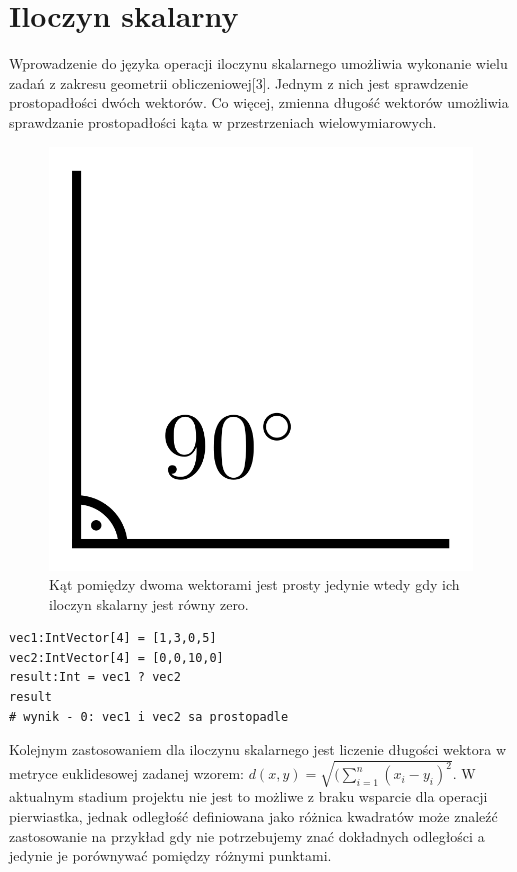 \section{Iloczyn skalarny}
Wprowadzenie do języka operacji iloczynu skalarnego umożliwia wykonanie wielu zadań z zakresu geometrii obliczeniowej[3]. Jednym z nich jest sprawdzenie prostopadłości dwóch wektorów. Co więcej, zmienna długość wektorów umożliwia sprawdzanie prostopadłości kąta w przestrzeniach wielowymiarowych.
\begin{figure}[!ht]
\centerline{
\includegraphics[scale=0.1]{images/kat_prosty}}
\caption{Kąt pomiędzy dwoma wektorami jest prosty jedynie wtedy gdy ich iloczyn skalarny jest równy zero.}
\end{figure}
\begin{lstlisting}[frame=single]
vec1:IntVector[4] = [1,3,0,5]
vec2:IntVector[4] = [0,0,10,0]
result:Int = vec1 ? vec2
result 
# wynik - 0: vec1 i vec2 sa prostopadle
\end{lstlisting}
Kolejnym zastosowaniem dla iloczynu skalarnego jest liczenie długości wektora w metryce euklidesowej zadanej wzorem:
$ d(x,y) = \sqrt{(\sum_{i=1}^{n} (x_i - y_i)^2}$. W aktualnym stadium projektu nie jest to możliwe z braku wsparcie dla operacji pierwiastka, jednak odległość definiowana jako różnica kwadratów może znaleźć zastosowanie na przykład gdy nie potrzebujemy znać dokładnych odległości a jedynie je porównywać pomiędzy różnymi punktami.

